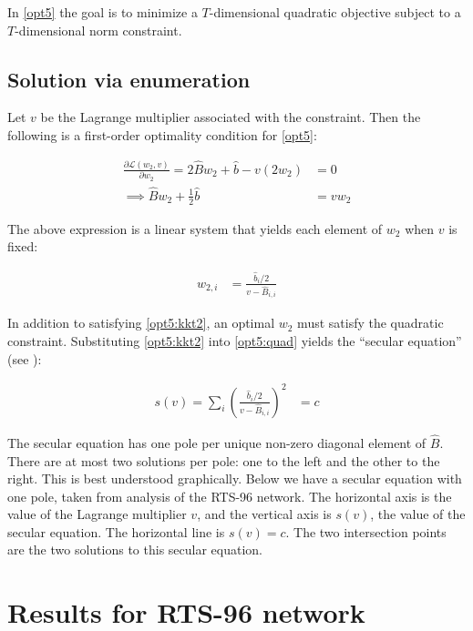 \documentclass[conference]{IEEEtran}
\begin{document}
In \eqref{opt5} the goal is to minimize a $T$-dimensional quadratic objective subject to a $T$-dimensional norm constraint.


\subsection{Solution via enumeration}

Let $v$ be the Lagrange multiplier associated with the constraint. Then the following is a first-order optimality condition for \eqref{opt5}:

\begin{align}
\nonumber \frac{\partial \mathcal{L}(w_2,v)}{\partial w_2} = 2\hat{B}w_2 + \hat{b} - v(2w_2) &= 0 \\
\label{opt5:kkt} \implies \hat{B}w_2 + \frac{1}{2}\hat{b} &= vw_2
\end{align}

The above expression is a linear system that yields each element of $w_2$ when $v$ is fixed:

\begin{align}
\label{opt5:kkt2}w_{2,i} &= \frac{\hat{b}_i/2}{v - \hat{B}_{i,i}}
\end{align}

In addition to satisfying \eqref{opt5:kkt2}, an optimal $w_2$ must satisfy the quadratic constraint. Substituting \eqref{opt5:kkt2} into \eqref{opt5:quad} yields the ``secular equation'' (see \cite{bienstock2014}):

\begin{align}
s(v) = \sum_{i}\left( \frac{\hat{b}_i /2}{v - \hat{B}_{i,i}}\right)^2 &= c
\end{align}

The secular equation has one pole per unique non-zero diagonal element of $\hat{B}$. There are at most two solutions per pole: one to the left and the other to the right. This is best understood graphically. Below we have a secular equation with one pole, taken from analysis of the RTS-96 network. The horizontal axis is the value of the Lagrange multiplier $v$, and the vertical axis is $s(v)$, the value of the secular equation. The horizontal line is $s(v)=c$. The two intersection points are the two solutions to this secular equation.

\section{Results for RTS-96 network}
\end{document}
